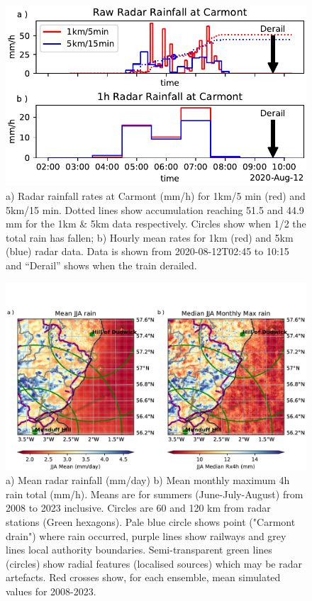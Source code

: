 \documentclass[11pt,a4paper]{article}
\begin{document}
\clearpage
\begin{figure}[ht!]
	\centering
	\includegraphics[width=0.5\linewidth]{radar_carmont}
	\caption{a) Radar rainfall rates at Carmont (mm/h) for 1km/5 min (red) and 5km/15 min. Dotted lines show accumulation reaching 51.5 and 44.9 mm for the 1km \& 5km data respectively. Circles show when 1/2 the total rain has fallen; b) Hourly mean rates for 1km (red) and 5km (blue) radar data. Data is shown from 2020-08-12T02:45 to 10:15 and ``Derail'' shows when the train derailed. }
	\label{fig:aug2020_rain}
\end{figure}

\begin{figure}[ht!]
	\centering
	\includegraphics[width=\linewidth]{radar_jja}
	\caption{a) Mean radar rainfall (mm/day) b) Mean monthly maximum 4h rain total (mm/h). Means are for summers (June-July-August) from 2008 to 2023 inclusive. Circles are  60 and 120 km from radar stations (Green hexagons). Pale blue circle shows point ("Carmont drain") where rain occurred, purple lines show railways and grey lines local authority boundaries. Semi-transparent green lines (circles) show radial features (localised sources) which may be radar artefacts. Red crosses show, for each ensemble, mean simulated values for 2008-2023.}
	\label{fig:radar_jja}
\end{figure}
\end{document}
